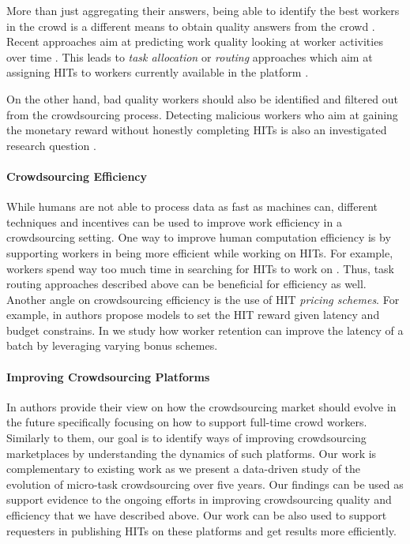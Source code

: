 More than just aggregating their answers,  being able to identify the best workers in the crowd is a different  means to obtain quality answers from the crowd \cite{pickacrowd,bozzon}. 
% 
Recent approaches aim at predicting work quality looking at worker activities over time  \cite{Jung14-hcomp}.
% 
This leads to \emph{task allocation} or \emph{routing} approaches which aim at assigning HITs to  workers currently available in the platform \cite{goel2014mechanism,crowdstar}.

On the other hand, bad quality workers should also be identified and filtered out from the crowdsourcing process.
Detecting malicious workers who aim at gaining the monetary reward without honestly  completing HITs is also an investigated research question \cite{collusion}.






\paragraph{Crowdsourcing Efficiency}
While humans are not able to process data as fast as machines can, different techniques and incentives can be used to improve work efficiency in a crowdsourcing setting.
% 
One way to improve human computation efficiency is by supporting workers in being more efficient while working on HITs. For example, workers spend way too much time in searching for HITs to work on \cite{Kucherbaev:2014:TET:2598153.2602249}. Thus, task routing approaches described above can be beneficial for efficiency as well.
% 
Another angle on crowdsourcing efficiency is the use of HIT \emph{pricing schemes}. For example, in \cite{finishthem} authors propose models to set the HIT reward given latency and budget constrains. In \cite{scaleup} we study how worker retention can improve the latency of a batch by leveraging varying bonus schemes.

\paragraph{Improving Crowdsourcing Platforms}
In \cite{Kittur:2013:FCW:2441776.2441923} authors provide their view on how the crowdsourcing market should evolve in the future specifically focusing on how to  support full-time crowd workers. Similarly to them, our goal is to identify ways of improving crowdsourcing marketplaces by understanding the dynamics of such platforms.
Our work is complementary to existing work as we present a data-driven study of the evolution of micro-task crowdsourcing over five years.
Our findings can be used as support evidence to the ongoing efforts in improving crowdsourcing quality and efficiency that we have described above.
Our work can be also used to support requesters in publishing HITs on these platforms and get results more efficiently.




